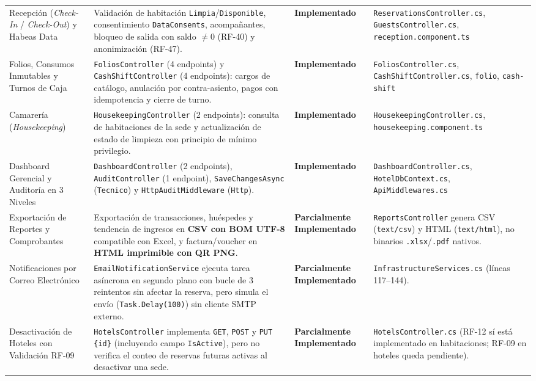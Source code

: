 \documentclass[12pt,a4paper]{article}
\begin{document}
\begin{longtable}{p{3.4cm} p{5.8cm} p{2.3cm} p{3.1cm}}
Recepci\'on (\textit{Check-In} / \textit{Check-Out}) y Habeas Data & Validaci\'on de habitaci\'on \texttt{Limpia}/\texttt{Disponible}, consentimiento \texttt{DataConsents}, acompa\~nantes, bloqueo de salida con saldo $\neq 0$ (RF-40) y anonimizaci\'on (RF-47). & \textbf{Implementado} & \texttt{ReservationsController.cs}, \texttt{GuestsController.cs}, \texttt{reception.component.ts}\\[0.15cm]
Folios, Consumos Inmutables y Turnos de Caja & \texttt{FoliosController} (4 endpoints) y \texttt{CashShiftController} (4 endpoints): cargos de cat\'alogo, anulaci\'on por contra-asiento, pagos con idempotencia y cierre de turno. & \textbf{Implementado} & \texttt{FoliosController.cs}, \texttt{CashShiftController.cs}, \texttt{folio}, \texttt{cash-shift}\\[0.15cm]
Camarer\'ia (\textit{Housekeeping}) & \texttt{HousekeepingController} (2 endpoints): consulta de habitaciones de la sede y actualizaci\'on de estado de limpieza con principio de m\'inimo privilegio. & \textbf{Implementado} & \texttt{HousekeepingController.cs}, \texttt{housekeeping.component.ts}\\[0.15cm]
Dashboard Gerencial y Auditor\'ia en 3 Niveles & \texttt{DashboardController} (2 endpoints), \texttt{AuditController} (1 endpoint), \texttt{SaveChangesAsync} (\texttt{Tecnico}) y \texttt{HttpAuditMiddleware} (\texttt{Http}). & \textbf{Implementado} & \texttt{DashboardController.cs}, \texttt{HotelDbContext.cs}, \texttt{ApiMiddlewares.cs}\\[0.15cm]
Exportaci\'on de Reportes y Comprobantes & Exportaci\'on de transacciones, hu\'espedes y tendencia de ingresos en \textbf{CSV con BOM UTF-8} compatible con Excel, y factura/voucher en \textbf{HTML imprimible con QR PNG}. & \textbf{Parcialmente Implementado} & \texttt{ReportsController} genera CSV (\texttt{text/csv}) y HTML (\texttt{text/html}), no binarios \texttt{.xlsx}/\texttt{.pdf} nativos.\\[0.15cm]
Notificaciones por Correo Electr\'onico & \texttt{EmailNotificationService} ejecuta tarea as\'incrona en segundo plano con bucle de 3 reintentos sin afectar la reserva, pero simula el env\'io (\texttt{Task.Delay(100)}) sin cliente SMTP externo. & \textbf{Parcialmente Implementado} & \texttt{InfrastructureServices.cs} (l\'ineas 117--144).\\[0.15cm]
Desactivaci\'on de Hoteles con Validaci\'on RF-09 & \texttt{HotelsController} implementa \texttt{GET}, \texttt{POST} y \texttt{PUT \{id\}} (incluyendo campo \texttt{IsActive}), pero no verifica el conteo de reservas futuras activas al desactivar una sede. & \textbf{Parcialmente Implementado} & \texttt{HotelsController.cs} (RF-12 s\'i est\'a implementado en habitaciones; RF-09 en hoteles queda pendiente).\\[0.15cm]

\end{longtable}
\end{document}
